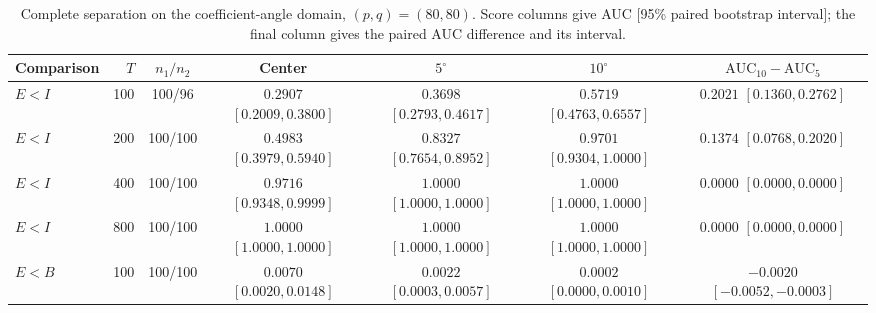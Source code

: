 \documentclass[12pt,letterpaper]{article}
\def\spacingset#1{\renewcommand{\baselinestretch}{#1}\small\normalsize}
\theoremstyle{plain}
\theoremstyle{definition}
\begin{document}
\begin{table}[p]
\begingroup
\spacingset{1.0}
\small\centering
\caption{Complete separation on the coefficient-angle domain, $(p,q)=(80,80)$. Score columns give AUC [95\% paired bootstrap interval]; the final column gives the paired AUC difference and its interval.}
\label{s23:lambda:allauc:p80q80}
\footnotesize
\setlength{\tabcolsep}{3.5pt}
\renewcommand{\arraystretch}{1.10}
\begin{adjustbox}{max width=\linewidth}
\begin{tabular}{lrccccc}
\toprule
Comparison & $T$ & $n_1/n_2$ & Center & $5^\circ$ & $10^\circ$ & $\mathrm{AUC}_{10}-\mathrm{AUC}_{5}$\\
\midrule
$E<I$ & 100 & 100/96 & \shortstack{$0.2907$\\{\scriptsize$[0.2009,0.3800]$}} & \shortstack{$0.3698$\\{\scriptsize$[0.2793,0.4617]$}} & \shortstack{$0.5719$\\{\scriptsize$[0.4763,0.6557]$}} & \shortstack{$0.2021$\\{\scriptsize$[0.1360,0.2762]$}}\\
$E<I$ & 200 & 100/100 & \shortstack{$0.4983$\\{\scriptsize$[0.3979,0.5940]$}} & \shortstack{$0.8327$\\{\scriptsize$[0.7654,0.8952]$}} & \shortstack{$0.9701$\\{\scriptsize$[0.9304,1.0000]$}} & \shortstack{$0.1374$\\{\scriptsize$[0.0768,0.2020]$}}\\
$E<I$ & 400 & 100/100 & \shortstack{$0.9716$\\{\scriptsize$[0.9348,0.9999]$}} & \shortstack{$1.0000$\\{\scriptsize$[1.0000,1.0000]$}} & \shortstack{$1.0000$\\{\scriptsize$[1.0000,1.0000]$}} & \shortstack{$0.0000$\\{\scriptsize$[0.0000,0.0000]$}}\\
$E<I$ & 800 & 100/100 & \shortstack{$1.0000$\\{\scriptsize$[1.0000,1.0000]$}} & \shortstack{$1.0000$\\{\scriptsize$[1.0000,1.0000]$}} & \shortstack{$1.0000$\\{\scriptsize$[1.0000,1.0000]$}} & \shortstack{$0.0000$\\{\scriptsize$[0.0000,0.0000]$}}\\
\addlinespace
$E<B$ & 100 & 100/100 & \shortstack{$0.0070$\\{\scriptsize$[0.0020,0.0148]$}} & \shortstack{$0.0022$\\{\scriptsize$[0.0003,0.0057]$}} & \shortstack{$0.0002$\\{\scriptsize$[0.0000,0.0010]$}} & \shortstack{$-0.0020$\\{\scriptsize$[-0.0052,-0.0003]$}}\\

\end{tabular}
\end{adjustbox}
\end{table}
\end{document}
